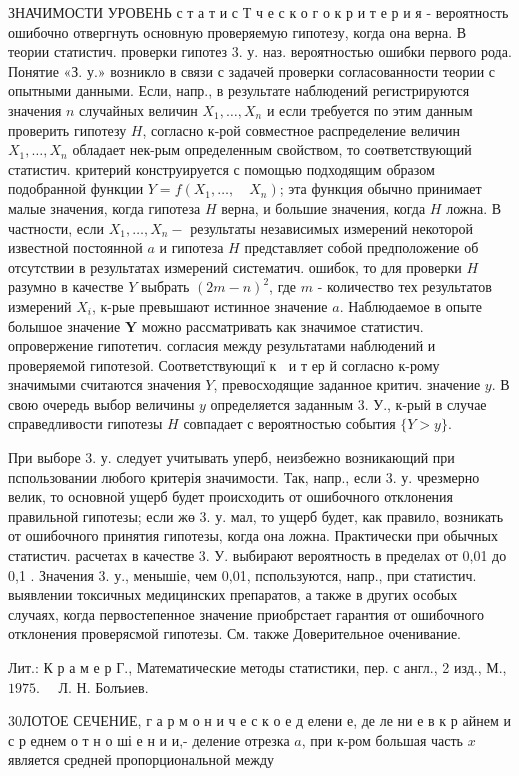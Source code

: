 \documentclass[10pt]{article}
\begin{document}
ЗНАЧИМОСТИ УРОВЕНЬ с т а т и с Т ч е с к о г о к р и т е р и я - вероятность ошибочно отвергнуть основную проверяемую гипотезу, когда она верна. В теории статистич. проверки гипотез 3. у. наз. вероятностью ошибки первого рода. Понятие «З. у.» возникло в связи с задачей проверки согласованности теории с опытными данными. Если, напр., в результате наблюдений регистрируются значения $n$ случайных величин $X_{1}, \ldots, X_{n}$ и если требуется по этим данным проверить гипотезу $H$, согласно к-рой совместное распределение величин $X_{1}, \ldots, X_{n}$ обладает нек-рым определенным свойством, то соөтветствующий статистич. критерий конструируется с помощью подходящим образом подобранной функции $Y=f\left(X_{1}, \ldots, \quad X_{n}\right)$; эта функция обычно принимает малые значения, когда гипотеза $H$ верна, и большие значения, когда $H$ ложна. В частности, если $X_{1}, \ldots, X_{n}-$ результаты независимых измерений некоторой известной постоянной $a$ и гипотеза $H$ представляет собой предположение об отсутствии в результатах измерений систематич. ошибок, то для проверки $H$ разумно в качестве $Y$ выбрать $(2 m-n)^{2}$, где $m$ - количество тех результатов измерений $X_{i}$, к-рые превышают истинное значение $a$. Наблюдаемое в опыте болышое значение $\boldsymbol{Y}$ можно рассматривать как значимое статистич. опровержение гипотетич. согласия между результатами наблюдений и проверяемой гипотезой. Соответствующиї к $\mathbf{~}$ и т ер й согласно к-рому значимыми считаются значения $Y$, превосходящие заданное критич. значение $y$. В свою очередь выбор величины $y$ определяется заданным 3. У., к-рый в случае справедливости гипотезы $H$ совпадает с вероятностью события $\{Y>y\}$.



При выборе 3. у. следует учитывать уперб, неизбежно возникающий при пспользовании любого критерія значимости. Так, напр., если 3. у. чрезмерно велик, то основной ущерб будет происходить от ошибочного отклонения правильной гипотезы; если жө 3. у. мал, то ущерб будет, как правило, возникать от ошибочного принятия гипотезы, когда она ложна. Практически при обычных статистич. расчетах в качестве 3. У. выбирают вероятность в пределах от 0,01 до 0,1 . Значения 3. у., менышіе, чем 0,01, пспользуются, напр., при статистич. выявлении токсичных медицинских препаратов, а также в других особых случаях, когда первостепенное значение приобрстает гарантия от ошибочного отклонения проверясмой гипотезы. См. также Доверительное оченивание.



Лит.: К р а м е р Г., Математические методы статистики, пер. с англ., 2 изд., М., $1975 . \quad$ Л. Н. Болъиев.



30ЛОТОЕ СЕЧЕНИЕ, $г$ а р м о н и ч е с к о е д елени е, де ле ни е в к р айнем и с р еднем о т н о ші е н и и,- деление отрезка $a$, при к-ром большая часть $x$ является средней пропорциональной между
\end{document}
